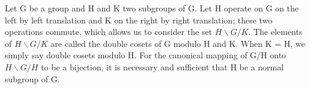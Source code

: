 Let G be a group and H and K two subgroups of G. Let H operate on G on the left by left translation and K on the right by right translation; these two operations commute, which allows us to consider the set \(H\backslash G/K\). The elements of \(H\backslash G/K\) are called the double cosets of G modulo H and K. When K = H, we simply say double cosets modulo H. For the canonical mapping of G/H onto \(H\backslash G/H\) to be a bijection, it is necessary and sufficient that H be a normal subgroup of G.

